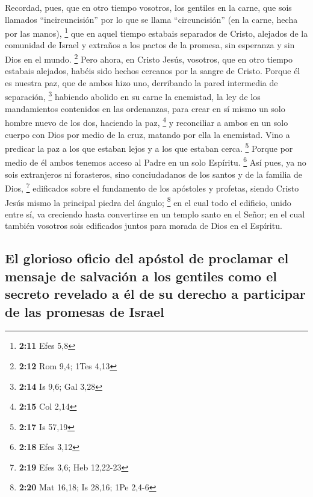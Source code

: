  Recordad, pues, que en otro tiempo vosotros, los
gentiles en la carne, que sois llamados ``incircuncisión'' por lo que se
llama ``circuncisión'' (en la carne, hecha por las manos), \footnote{\textbf{2:11}
  Efes 5,8}  que en aquel tiempo estabais separados de
Cristo, alejados de la comunidad de Israel y extraños a los pactos de la
promesa, sin esperanza y sin Dios en el mundo. \footnote{\textbf{2:12}
  Rom 9,4; 1Tes 4,13}  Pero ahora, en Cristo Jesús,
vosotros, que en otro tiempo estabais alejados, habéis sido hechos
cercanos por la sangre de Cristo.  Porque él es nuestra
paz, que de ambos hizo uno, derribando la pared intermedia de
separación, \footnote{\textbf{2:14} Is 9,6; Gal 3,28} 
habiendo abolido en su carne la enemistad, la ley de los mandamientos
contenidos en las ordenanzas, para crear en sí mismo un solo hombre
nuevo de los dos, haciendo la paz, \footnote{\textbf{2:15} Col 2,14}
 y reconciliar a ambos en un solo cuerpo con Dios por
medio de la cruz, matando por ella la enemistad.  Vino a
predicar la paz a los que estaban lejos y a los que estaban cerca.
\footnote{\textbf{2:17} Is 57,19}  Porque por medio de él
ambos tenemos acceso al Padre en un solo Espíritu. \footnote{\textbf{2:18}
  Efes 3,12}  Así pues, ya no sois extranjeros ni
forasteros, sino conciudadanos de los santos y de la familia de Dios,
\footnote{\textbf{2:19} Efes 3,6; Heb 12,22-23} 
edificados sobre el fundamento de los apóstoles y profetas, siendo
Cristo Jesús mismo la principal piedra del ángulo; \footnote{\textbf{2:20}
  Mat 16,18; Is 28,16; 1Pe 2,4-6}  en el cual todo el
edificio, unido entre sí, va creciendo hasta convertirse en un templo
santo en el Señor;  en el cual también vosotros sois
edificados juntos para morada de Dios en el Espíritu.

\hypertarget{el-glorioso-oficio-del-apuxf3stol-de-proclamar-el-mensaje-de-salvaciuxf3n-a-los-gentiles-como-el-secreto-revelado-a-uxe9l-de-su-derecho-a-participar-de-las-promesas-de-israel}{%
\subsection{El glorioso oficio del apóstol de proclamar el mensaje de
salvación a los gentiles como el secreto revelado a él de su derecho a
participar de las promesas de
Israel}\label{el-glorioso-oficio-del-apuxf3stol-de-proclamar-el-mensaje-de-salvaciuxf3n-a-los-gentiles-como-el-secreto-revelado-a-uxe9l-de-su-derecho-a-participar-de-las-promesas-de-israel}}

